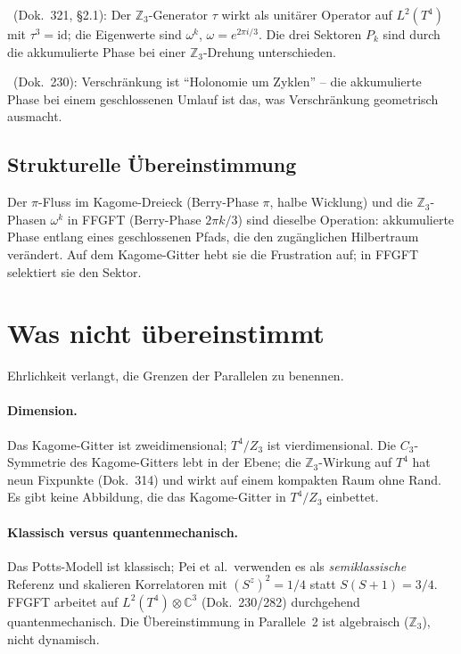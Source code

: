 \BM\ (Dok.~321, §2.1): Der $\mathbb{Z}_3$-Generator $\tau$ wirkt als unitärer
Operator auf $L^2(T^4)$ mit $\tau^3=\mathrm{id}$; die Eigenwerte sind
$\omega^k$, $\omega=e^{2\pi i/3}$. Die drei Sektoren $P_k$ sind durch die
akkumulierte Phase bei einer $\mathbb{Z}_3$-Drehung unterschieden.

\BM\ (Dok.~230): Verschränkung ist \enquote{Holonomie um Zyklen} -- die
akkumulierte Phase bei einem geschlossenen Umlauf ist das, was
Verschränkung geometrisch ausmacht.

\subsection{Strukturelle Übereinstimmung}

Der $\pi$-Fluss im Kagome-Dreieck (Berry-Phase $\pi$, halbe Wicklung) und
die $\mathbb{Z}_3$-Phasen $\omega^k$ in FFGFT (Berry-Phase $2\pi k/3$) sind
dieselbe Operation: akkumulierte Phase entlang eines geschlossenen Pfads, die
den zugänglichen Hilbertraum verändert. Auf dem Kagome-Gitter hebt sie die
Frustration auf; in FFGFT selektiert sie den Sektor. \SM

\section{Was nicht übereinstimmt}

Ehrlichkeit verlangt, die Grenzen der Parallelen zu benennen.

\paragraph{Dimension.} Das Kagome-Gitter ist zweidimensional; $T^4/Z_3$ ist
vierdimensional. Die $C_3$-Symmetrie des Kagome-Gitters lebt in der Ebene;
die $\mathbb{Z}_3$-Wirkung auf $T^4$ hat neun Fixpunkte (Dok.~314) und
wirkt auf einem kompakten Raum ohne Rand. Es gibt keine Abbildung, die das
Kagome-Gitter in $T^4/Z_3$ einbettet.

\paragraph{Klassisch versus quantenmechanisch.} Das Potts-Modell ist
klassisch; Pei et al.\ verwenden es als \emph{semiklassische} Referenz und
skalieren Korrelatoren mit $(S^z)^2=1/4$ statt $S(S+1)=3/4$. FFGFT arbeitet
auf $L^2(T^4)\otimes\mathbb{C}^3$ (Dok.~230/282) durchgehend
quantenmechanisch. Die Übereinstimmung in Parallele~2 ist algebraisch
($\mathbb{Z}_3$), nicht dynamisch.

